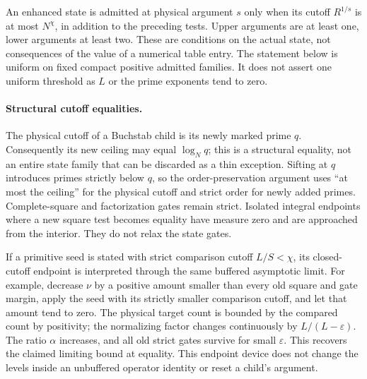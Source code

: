 \documentclass[11pt]{article}
\begin{document}
An enhanced state is admitted at physical argument $s$ only when its
cutoff $R^{1/s}$ is at most $N^\chi$, in addition to the preceding
tests. Upper arguments are at least one, lower arguments at least two.
These are conditions on the actual state, not consequences of the value
of a numerical table entry. The statement below is uniform on fixed
compact positive admitted families. It does not assert one uniform
threshold as $L$ or the prime exponents tend to zero.

\paragraph{Structural cutoff equalities.}
The physical cutoff of a Buchstab child is its newly marked prime $q$.
Consequently its new ceiling may equal $\log_Nq$; this is a structural
equality, not an entire state family that can be discarded as a thin
exception. Sifting at $q$ introduces primes strictly below $q$, so the
order-preservation argument uses ``at most the ceiling'' for the physical
cutoff and strict order for newly added primes. Complete-square and
factorization gates remain strict. Isolated integral endpoints where a
new square test becomes equality have measure zero and are approached
from the interior. They do not relax the state gates.

If a primitive seed is stated with strict comparison cutoff $L/S<\chi$,
its closed-cutoff endpoint is interpreted through the same buffered
asymptotic limit. For example, decrease $\nu$ by a positive amount
smaller than every old square and gate margin, apply the seed with its
strictly smaller comparison cutoff, and let that amount tend to zero.
The physical target count is bounded by the compared count by positivity;
the normalizing factor changes continuously by $L/(L-\varepsilon)$.
The ratio $\alpha$ increases, and all old strict gates survive for small
$\varepsilon$. This recovers the claimed limiting bound at equality.
This endpoint device does not change the levels inside an unbuffered
operator identity or reset a child's argument.
\end{document}

